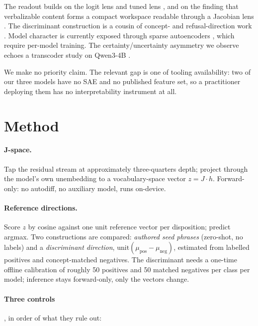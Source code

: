 \documentclass[11pt]{article}
\begin{document}
The readout builds on the logit lens \citep{nostalgebraist2020logitlens} and tuned lens
\citep{belrose2023tunedlens}, and on the finding that verbalizable content forms a compact
workspace readable through a Jacobian lens \citep{gurnee2026workspace}. The discriminant
construction is a cousin of concept- and refusal-direction work
\citep{arditi2024refusal}. Model character is currently exposed through
sparse autoencoders \citep{rajamanoharan2024jumprelu}, which require per-model training. The
certainty/uncertainty asymmetry we observe echoes a transcoder study on Qwen3-4B
\citep{mazzaccara2026overconfidence}.

We make no priority claim. The relevant gap is one of tooling availability: two of our three
models have no SAE and no published feature set, so a practitioner deploying them has no
interpretability instrument at all.

\section{Method}

\paragraph{J-space.} Tap the residual stream at approximately three-quarters depth; project
through the model's own unembedding to a vocabulary-space vector $z = J \cdot h$. Forward-only:
no autodiff, no auxiliary model, runs on-device.

\paragraph{Reference directions.} Score $z$ by cosine against one unit reference vector per
disposition; predict argmax. Two constructions are compared: \emph{authored seed phrases}
(zero-shot, no labels) and a \emph{discriminant direction},
$\mathrm{unit}(\mu_{\mathrm{pos}} - \mu_{\mathrm{neg}})$, estimated from labelled positives and
concept-matched negatives. The discriminant needs a one-time offline calibration of roughly 50
positives and 50 matched negatives per class per model; inference stays forward-only, only the
vectors change.

\paragraph{Three controls}, in order of what they rule out:
\end{document}
